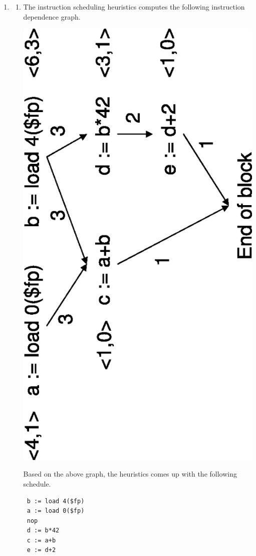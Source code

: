 \documentclass{article}
\begin{document}
\begin{enumerate}
\begin{enumerate}
\end{enumerate}

\newpage

\item 

\begin{enumerate}
\item 
The instruction scheduling heuristics computes the following instruction
dependence graph. 
\begin{center}
\includegraphics[angle=-90,scale=0.5]{wa10-s2a}
\end{center}
Based on the above graph, the heuristics comes up with the following
schedule. 
\begin{verbatim}
 b := load 4($fp)
 a := load 0($fp)
 nop
 d := b*42
 c := a+b
 e := d+2
\end{verbatim}


\end{enumerate}
\end{enumerate}
\end{document}
